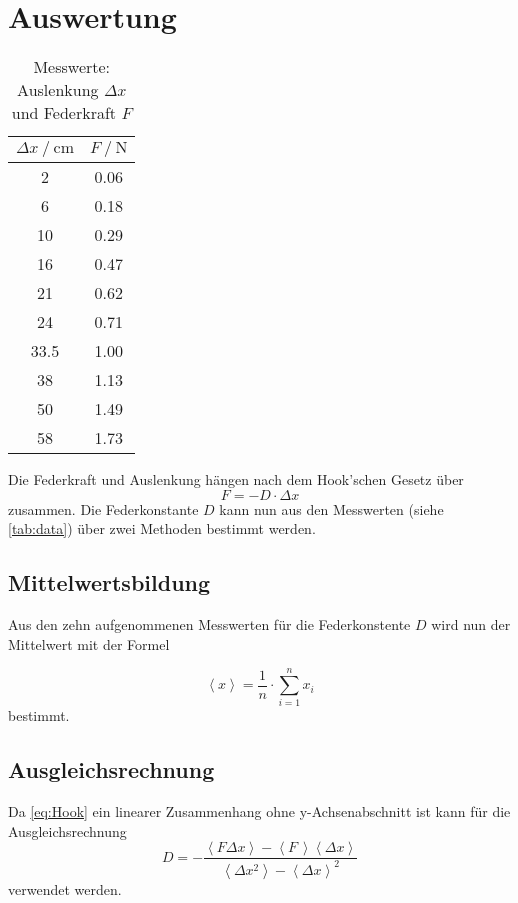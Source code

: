 \section{Auswertung}
\label{sec:Auswertung}
\begin{table}
  \centering
  \caption{Messwerte: Auslenkung $\Delta x $ und Federkraft $F$}
  \label{tab:data}
  \begin{tabular}{c c}
    \toprule 
    $\Delta x \:/\: \si{\centi\meter}$ & $F \:/\: \si{\newton}$ \\ 
    \midrule 
    2 & 0.06 \\
    6 & 0.18 \\
    10 & 0.29 \\
    16 & 0.47 \\
    21 & 0.62 \\
    24 & 0.71 \\
    33.5 & 1.00 \\
    38 & 1.13 \\
    50 & 1.49 \\
    58 & 1.73 \\ 
    \bottomrule
  \end{tabular}
\end{table} 
\noindent Die Federkraft und Auslenkung hängen nach dem Hook'schen Gesetz über
\begin{equation}
  \label{eq:Hook}
  F = - D \cdot \Delta x
\end{equation}
zusammen.
Die Federkonstante $D$ kann nun aus den Messwerten (siehe \autoref{tab:data}) über zwei Methoden bestimmt werden.

\newpage

\subsection{Mittelwertsbildung}
Aus den zehn aufgenommenen Messwerten für die Federkonstente $D$ wird nun der Mittelwert mit der Formel

\begin{equation}
  \label{eq:Mittelwert}
  \left< x \right> = \frac{1}{n} \cdot \sum_{i=1}^{n} x_i
\end{equation}
bestimmt. 

\subsection{Ausgleichsrechnung}

Da \autoref{eq:Hook} ein linearer Zusammenhang ohne y-Achsenabschnitt ist kann für die Ausgleichsrechnung
\begin{equation}
  \label{eq:Lin-Ausgleich}
  D = - \frac
  {\left< F \Delta x \right> - \left< F \, \right> \left< \Delta x \right>}
  {\left< \Delta x^2 \right> - \left< \Delta x \right> ^2}
\end{equation}
verwendet werden.

